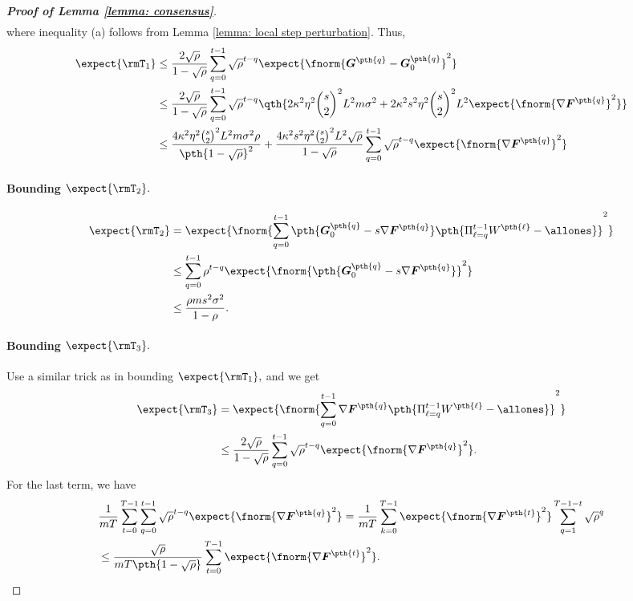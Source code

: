 \documentclass[letterpaper, 10 pt, conference]{ieeeconf}  %
\begin{document}
\begin{proof}[\bf Proof of Lemma \ref{lemma: consensus}]
\begin{align*}
\end{align*}
where inequality (a) follows from Lemma \ref{lemma: local step perturbation}.  
Thus,
\begin{align*}
    \expect{\rmT_1 } 
    & \le \frac{2\sqrt{\rho}}{1-\sqrt{\rho}}\sum_{q=0}^{t-1} 
    \sqrt{\rho}^{t-q}\expect{\fnorm{\bm{G}^{\pth{q}} - \bm{G}_0^{\pth{q}}}^2 }\\
    &\le \frac{2\sqrt{\rho}}{1-\sqrt{\rho}}\sum_{q=0}^{t-1} 
    \sqrt{\rho}^{t-q} \qth{
      2 \kappa^2 \eta^2 \binom{s}{2}^2 L^2 m \sigma^2 
    + 2 \kappa^2 s^2 \eta^2 \binom{s}{2}^2 L^2 \expect{\fnorm{\nabla \bm{F}^{\pth{q}}}^2 }
    }\\
    & \le \frac{4\kappa^2 \eta^2 \binom{s}{2}^2 L^2 m \sigma^2 \rho}{\pth{1-\sqrt{\rho}}^2}
        + \frac{4\kappa^2 s^2 \eta^2 \binom{s}{2}^2 L^2\sqrt{\rho}}{1-\sqrt{\rho}}
    \sum_{q=0}^{t-1} \sqrt{\rho}^{t-q}
    \expect{\fnorm{\nabla \bm{F}^{\pth{q}}}^2}
\end{align*}
\paragraph{Bounding $\expect{\rmT_2 }.$}
\begin{align*}
    \expect{\rmT_2 } & = \expect{\fnorm{
    \sum_{q=0}^{t-1} 
    \pth{\bm{G}_0^{\pth{q}} - s\nabla \bm{F}^{\pth{q}}}
    \pth{\Pi_{\ell=q}^{t-1} W^{\pth{\ell}} - \allones}
    }^2 }\\
    &\le \sum_{q=0}^{t-1}\rho^{t-q}\expect{
    \fnorm{
    \pth{\bm{G}_0^{\pth{q}} - s\nabla \bm{F}^{\pth{q}}}
    }^2}\\
    &\le \frac{\rho m s^2 \sigma^2}{1-\rho} .
\end{align*}
\paragraph{Bounding $\expect{\rmT_3}.$}
Use a similar trick as in bounding $\expect{\rmT_1},$ and we get
\begin{align*}
\expect{\rmT_3} &= \expect{\fnorm{\sum_{q=0}^{t-1}\nabla \bm{F}^{\pth{q}}\pth{\Pi_{\ell=q}^{t-1} W^{\pth{\ell}} - \allones}}^2}  \\
& \le \frac{2\sqrt{\rho}}{1-\sqrt{\rho}}\sum_{q=0}^{t-1} \sqrt{\rho}^{t-q}\expect{\fnorm{\nabla \bm{F}^{\pth{q}}}^2 }.
\end{align*}
For the last term, we have
\begin{align*}
&\frac{1}{mT}\sum_{t=0}^{T-1}\sum_{q=0}^{t-1} 
\sqrt{\rho}^{t-q}\expect{\fnorm{\nabla \bm{F}^{\pth{q}}}^2} 
= \frac{1}{mT}\sum_{k=0}^{T-1}\expect{\fnorm{\nabla \bm{F}^{\pth{t}}}^2} \sum_{q=1}^{T-1-t}\sqrt{\rho}^{q}\\
&\le \frac{\sqrt{\rho}}{mT\pth{1-\sqrt{\rho}}}\sum_{t=0}^{T-1}\expect{\fnorm{\nabla \bm{F}^{\pth{t}}}^2}.
\end{align*}

\end{proof}
\end{document}
